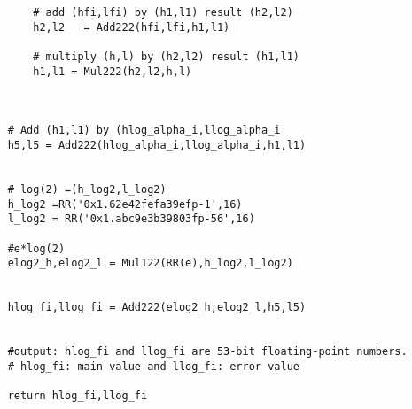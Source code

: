 \begin{lstlisting}
        # add (hfi,lfi) by (h1,l1) result (h2,l2)
        h2,l2   = Add222(hfi,lfi,h1,l1)

        # multiply (h,l) by (h2,l2) result (h1,l1)
        h1,l1 = Mul222(h2,l2,h,l)
        
    
    
    # Add (h1,l1) by (hlog_alpha_i,llog_alpha_i
    h5,l5 = Add222(hlog_alpha_i,llog_alpha_i,h1,l1)
    
    
    # log(2) =(h_log2,l_log2)
    h_log2 =RR('0x1.62e42fefa39efp-1',16)
    l_log2 = RR('0x1.abc9e3b39803fp-56',16)
    
    #e*log(2)
    elog2_h,elog2_l = Mul122(RR(e),h_log2,l_log2)
   

    hlog_fi,llog_fi = Add222(elog2_h,elog2_l,h5,l5)
    
    
    #output: hlog_fi and llog_fi are 53-bit floating-point numbers.
    # hlog_fi: main value and llog_fi: error value
    
    return hlog_fi,llog_fi
\end{lstlisting}

